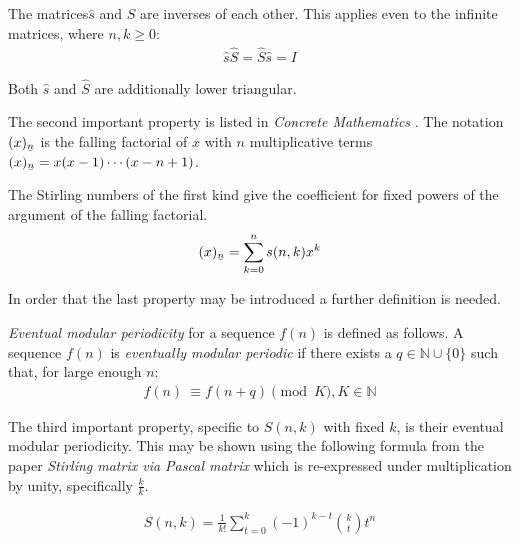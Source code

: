 \documentclass[12pt,reqno]{article}
\newcommand{\ubar}[1]{\text{\b{$#1$}}}
\begin{document}
\begin{proposition}
	The matrices$\hat{s}$ and $\hat{S}$ are inverses of each other. This applies even to the infinite matrices, where $n,k \geq 0$:
	\begin{align}
	\hat{s} \hat{S} = \hat{S} \hat{s} = I \label{eqn:stirlinginvs}
	\end{align}

	Both $\hat{s}$ and $\hat{S}$ are additionally lower triangular.

\end{proposition}

The second important property is listed in {\em Concrete Mathematics} \cite[Eqn.\ 6.13, p.\ 263]{cc:cm}.
The notation $(x)_{\ubar{n}}$ is the falling factorial of $x$ with $n$ multiplicative terms $(x)_{\ubar{n}} = x (x - 1) \cdots (x - n  + 1)$.

\begin{proposition}
	The Stirling numbers of the first kind give the coefficient for fixed powers of the argument of the falling factorial.
	\begin{align}
		(x)_{\ubar{n}} = \sum_{k = 0}^{n} s(n,k) x^{k}\label{eqn:fallfac}
	\end{align}
\end{proposition}

In order that the last property may be introduced a further definition is needed.

\begin{definition}
	{\em Eventual modular periodicity} for a sequence $f(n)$ is defined as follows. A sequence $f(n)$ is {\em eventually modular periodic} if there exists a $q \in \mathbb{N} \cup \{0\}$ such that,
	for large enough $n$:
	\begin{align}
		f(n)~{}  \equiv f(n + q) \pmod{K}, K \in \mathbb{N}
	\end{align}
\end{definition}

The third important property, specific to $S(n,k)$ with fixed $k$, is their eventual modular periodicity. This may be shown using the following formula from the paper \textit{Stirling matrix via Pascal matrix} \cite[p. 55]{cc:relation} which is re-expressed under multiplication by unity, specifically $\frac{k}{k}$.

\begin{lemma}
	\begin{align}
		S(n,k) = \frac{1}{k!} \sum_{t = 0}^{k}(-1)^{k-t}\binom{k}{t} t^{n}\label{eqn:stirlingsecond}
	\end{align}
\end{lemma}
\end{document}
